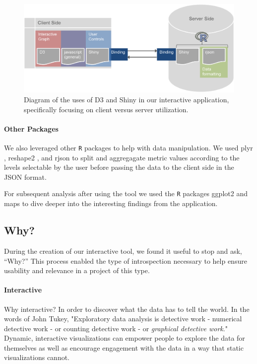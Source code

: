 \documentclass[11pt]{article}\usepackage{knitr}
\begin{document}
\begin{figure}[H]
\centering
\includegraphics[width=\textwidth]{images/D3shiny.png}
\caption{\label{fig:D3shiny} Diagram of the uses of D3 and Shiny in our interactive application, specifically focusing on client versus server utilization.}
\end{figure}

\paragraph{Other Packages}
We also leveraged other {\tt R} packages to help with data manipulation. We used plyr \cite{plyr}, reshape2 \cite{reshape2}, and rjson \cite{rjson} to split and aggregagate metric values according to the levels selectable by the user before passing the data to the client side in the JSON format. 

For subsequent analysis after using the tool we used the {\tt R} packages ggplot2 \cite{ggplot2} and maps \cite{maps} to dive deeper into the interesting findings from the application.


\subsection*{Why?}
During the creation of our interactive tool, we found it useful to stop and ask, ``Why?'' This process enabled the type of introspection necessary to help ensure usability and relevance in a project of this type.

\paragraph{Interactive}
Why interactive? In order to discover what the data has to tell the world. In the words of John Tukey, "Exploratory data analysis is detective work - numerical detective work - or counting detective work - or \emph{graphical detective work}." \cite{tukey77} Dynamic, interactive visualizations can empower people to explore the data for themselves as well as encourage engagement with the data in a way that static visualizations cannot.
\end{document}
